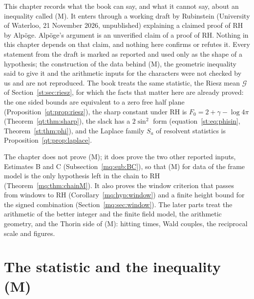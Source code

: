 \label{mq:ch:main}
This chapter records what the book can say, and what it cannot say, about an inequality called (M). It enters through a working draft by Rubinstein \cite{Rub26} (University of Waterloo, 21 November 2026, unpublished) explaining a claimed proof of RH by Alp\"oge. Alp\"oge's argument is an unverified claim of a proof of RH. Nothing in this chapter depends on that claim, and nothing here confirms or refutes it. Every statement from the draft is marked as reported and used only as the shape of a hypothesis; the construction of the data behind (M), the geometric inequality said to give it and the arithmetic inputs for the characters were not checked by us and are not reproduced. The book treats the same statistic, the Riesz mean $\mathcal G$ of Section~\ref{st:sec:riesz}, for which the facts that matter here are already proved: the one sided bounds are equivalent to a zero free half plane (Proposition~\ref{qt:prop:riesz}), the sharp constant under RH is $F_0=2+\gamma-\log4\pi$ (Theorem~\ref{qt:thm:sharp}), the slack has a $2\sin^2$ form (equation~\eqref{st:eq:phisin}, Theorem~\ref{st:thm:phi}), and the Laplace family $S_a$ of resolvent statistics is Proposition~\ref{qt:prop:laplace}.

The chapter does not prove (M); it does prove the two other reported inputs, Estimates B and C (Subsection~\ref{mq:sub:BC}), so that (M) for data of the frame model is the only hypothesis left in the chain to RH (Theorem~\ref{mq:thm:chainM}). It also proves the window criterion that passes from windows to RH (Corollary~\ref{mq:hyp:window}) and a finite height bound for the signed combination (Section~\ref{mq:sec:window}). The later parts treat the arithmetic of the better integer and the finite field model, the arithmetic geometry, and the Thorin side of (M): hitting times, Wald couples, the reciprocal scale and figures.

\section{The statistic and the inequality (M)}\label{mq:sec:setting}

